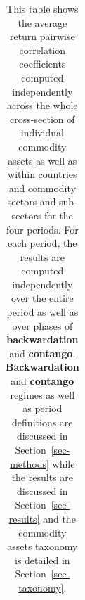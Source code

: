 \documentclass[
  authoryear,
  preprint,
  3p]{elsarticle}
\begin{document}
\begin{longtable}[t]{>{}l>{}l>{}l>{}r>{}r>{}r>{}r>{}r}

\caption{\label{tbl-correlations-inner-periods}This table shows the
average return pairwise correlation coefficients computed independently
across the whole cross-section of individual commodity assets as well as
within countries and commodity sectors and sub-sectors for the four
periods. For each period, the results are computed independently over
the entire period as well as over phases of \textbf{backwardation} and
\textbf{contango}. \textbf{Backwardation} and \textbf{contango} regimes
as well as period definitions are discussed in Section~\ref{sec-methods}
while the results are discussed in Section~\ref{sec-results} and the
commodity assets taxonomy is detailed in Section~\ref{sec-taxonomy}.}

\tabularnewline


\end{longtable}
\end{document}

